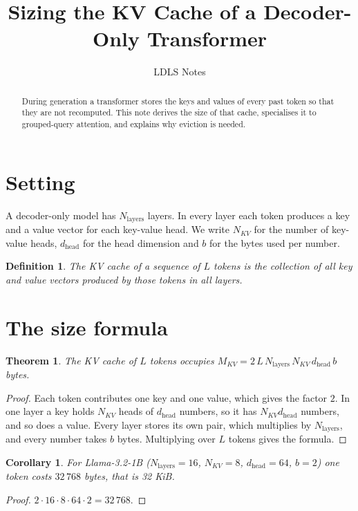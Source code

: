 \documentclass{article}
\title{Sizing the KV Cache of a Decoder-Only Transformer}
\author{LDLS Notes}
\newtheorem{theorem}{Theorem}
\newtheorem{corollary}{Corollary}
\newtheorem{definition}{Definition}
\begin{document}
\maketitle

\begin{abstract}
During generation a transformer stores the keys and values of every past token so that they are not recomputed.
This note derives the size of that cache, specialises it to grouped-query attention, and explains why eviction is needed.
\end{abstract}

\section{Setting}
A decoder-only model has $N_{\text{layers}}$ layers. In every layer each token produces a key and a value vector for each key-value head.
We write $N_{KV}$ for the number of key-value heads, $d_{\text{head}}$ for the head dimension and $b$ for the bytes used per number.

\begin{definition}
The \emph{KV cache} of a sequence of $L$ tokens is the collection of all key and value vectors produced by those tokens in all layers.
\end{definition}

\section{The size formula}
\begin{theorem}\label{thm:size}
The KV cache of $L$ tokens occupies $M_{KV} = 2 \, L \, N_{\text{layers}} \, N_{KV} \, d_{\text{head}} \, b$ bytes.
\end{theorem}
\begin{proof}
Each token contributes one key and one value, which gives the factor $2$.
In one layer a key holds $N_{KV}$ heads of $d_{\text{head}}$ numbers, so it has $N_{KV} d_{\text{head}}$ numbers, and so does a value.
Every layer stores its own pair, which multiplies by $N_{\text{layers}}$, and every number takes $b$ bytes.
Multiplying over $L$ tokens gives the formula.
\end{proof}

\begin{corollary}
For Llama-3.2-1B ($N_{\text{layers}} = 16$, $N_{KV} = 8$, $d_{\text{head}} = 64$, $b = 2$) one token costs $32\,768$ bytes, that is 32 KiB.
\end{corollary}
\begin{proof}
$2 \cdot 16 \cdot 8 \cdot 64 \cdot 2 = 32\,768$.
\end{proof}
\end{document}
